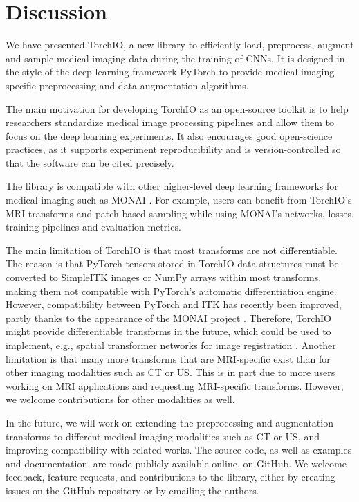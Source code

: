 \section{Discussion}
\label{sec:tio_discussion}

We have presented TorchIO, a new library to efficiently load, preprocess, augment and sample medical imaging data during the training of \acp{CNN}.
It is designed in the style of the deep learning framework PyTorch to provide medical imaging specific preprocessing and data augmentation algorithms.

The main motivation for developing TorchIO as an open-source toolkit is to help researchers standardize medical image processing pipelines and allow them to focus on the deep learning experiments.
It also encourages good open-science practices, as it supports experiment reproducibility and is version-controlled so that the software can be cited precisely.

The library is compatible with other higher-level deep learning frameworks for medical imaging such as \ac{MONAI} \cite{cardoso_monai_2022}.
For example, users can benefit from TorchIO's \ac{MRI} transforms and patch-based sampling while using \ac{MONAI}'s networks, losses, training pipelines and evaluation metrics.

The main limitation of TorchIO is that most transforms are not differentiable.
The reason is that PyTorch tensors stored in TorchIO data structures must be converted to SimpleITK images or NumPy arrays within most transforms, making them not compatible with PyTorch's automatic differentiation engine.
However, compatibility between PyTorch and ITK has recently been improved, partly thanks to the appearance of the \ac{MONAI} project \cite{mccormick_itk_2021}.
Therefore, TorchIO might provide differentiable transforms in the future, which could be used to implement, e.g., spatial transformer networks for image registration \cite{lee_image-and-spatial_2019}.
Another limitation is that many more transforms that are \ac{MRI}-specific exist than for other imaging modalities such as \ac{CT} or \ac{US}.
This is in part due to more users working on \ac{MRI} applications and requesting \ac{MRI}-specific transforms.
However, we welcome contributions for other modalities as well.

In the future, we will work on extending the preprocessing and augmentation transforms to different medical imaging modalities such as \ac{CT} or \ac{US}, and improving compatibility with related works.
The source code, as well as examples and documentation, are made publicly available online, on GitHub.
We welcome feedback, feature requests, and contributions to the library, either by creating issues on the GitHub repository or by emailing the authors.
